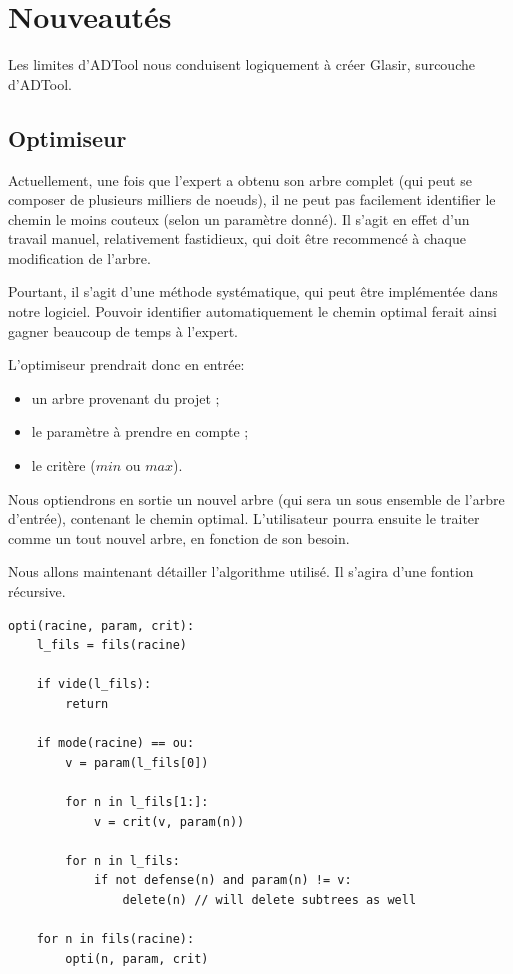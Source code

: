 \section{Nouveautés}
	
	Les limites d'ADTool nous conduisent logiquement à créer Glasir, surcouche d'ADTool.


	\subsection{Optimiseur}
		
		Actuellement, une fois que l'expert a obtenu son arbre complet (qui peut se composer de plusieurs milliers de noeuds), il ne peut pas facilement identifier le chemin le moins couteux (selon un paramètre donné).
		Il s'agit en effet d'un travail manuel, relativement fastidieux, qui doit être recommencé à chaque modification de l'arbre.
		
		Pourtant, il s'agit d'une méthode systématique, qui peut être implémentée dans notre logiciel.
		Pouvoir identifier automatiquement le chemin optimal ferait ainsi gagner beaucoup de temps à l'expert.
		
		L'optimiseur prendrait donc en entrée:
		\begin{itemize}
			\item un arbre provenant du projet ;
			\item le paramètre à prendre en compte ;
			\item le critère ($min$ ou $max$).
		\end{itemize}
		
		Nous optiendrons en sortie un nouvel arbre (qui sera un sous ensemble de l'arbre d'entrée), contenant le chemin optimal. 
		L'utilisateur pourra ensuite le traiter comme un tout nouvel arbre, en fonction de son besoin.
		
		Nous allons maintenant détailler l'algorithme utilisé. Il s'agira d'une fontion récursive.

		\begin{lstlisting}
opti(racine, param, crit):
	l_fils = fils(racine)

	if vide(l_fils):
		return

	if mode(racine) == ou:
		v = param(l_fils[0])

		for n in l_fils[1:]:
			v = crit(v, param(n))

		for n in l_fils:
			if not defense(n) and param(n) != v:
				delete(n) // will delete subtrees as well
	
	for n in fils(racine):
		opti(n, param, crit)
		\end{lstlisting}

